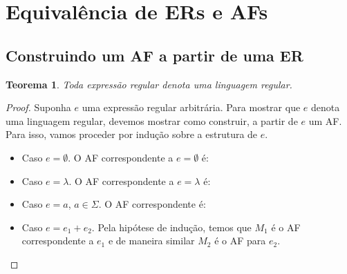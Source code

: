 \documentclass[a4paper]{article}
\newtheorem{Theorem}{Teorema}
\theoremstyle{definition}
\begin{document}
  \section{Equivalência de ERs e AFs}

  \subsection{Construindo um AF a partir de uma ER}
  
  \begin{Theorem}\label{teorema1}
    Toda expressão regular denota uma linguagem regular.
  \end{Theorem}
  \begin{proof}
    Suponha $e$ uma expressão regular arbitrária. Para mostrar que $e$ denota
    uma linguagem regular, devemos mostrar como construir, a partir de $e$ um
    AF. Para isso, vamos proceder por indução sobre a estrutura de $e$.
    \begin{itemize}
      \item Caso $e = \emptyset$. O AF correspondente a $e = \emptyset$ é:
        \begin{figure}[H]
          \centering
        \end{figure}
      \item Caso $e = \lambda$. O AF correspondente a $e = \lambda$ é:
        \begin{figure}[H]
          \centering
        \end{figure}
      \item Caso $e = a$, $a\in\Sigma$. O AF correspondente é:
        \begin{figure}[H]
          \centering
        \end{figure}
      \item Caso $e = e_1 + e_2$. Pela hipótese de indução, temos que $M_1$ é o
        AF correspondente a $e_1$ e de maneira similar $M_2$ é o AF para $e_2$.

\end{itemize}
\end{proof}
\end{document}
